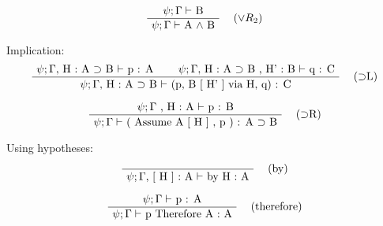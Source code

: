\documentclass[twoside,a4paper]{article}
\begin{document}
\[
\AxiomC{$\psi ; \Gamma \vdash$ B}
\RightLabel{\quad ($\vee R_2$)}
\UnaryInfC{$\psi ; \Gamma \vdash$ A $\wedge$ B}
\DisplayProof
\]

Implication:
\[
\AxiomC{$\psi ; \Gamma ,$ H : A $\supset$ B $\vdash$ p : A}
\AxiomC{$\psi ; \Gamma ,$ H : A $\supset$ B , H' : B $\vdash$ q : C}
\RightLabel{\quad ($\supset$L)}
\BinaryInfC{$\psi ; \Gamma ,$ H : A $\supset$ B $\vdash$
(p, B [ H' ] via H, q) : C}
\DisplayProof
\]

\[
\AxiomC{$\psi ; \Gamma$ , H : A $\vdash$ p : B}
\RightLabel{\quad ($\supset$R)}
\UnaryInfC{$\psi ; \Gamma \vdash$ ( Assume A [ H ] , p ) : A 
$\supset$ B}
\DisplayProof
\]

Using hypotheses:

\[
\AxiomC{}
\RightLabel{\quad (by)}
\UnaryInfC{$\psi ; \Gamma , $ [ H ] : A $\vdash$ by H : A}
\DisplayProof
\]

\[
\AxiomC{$\psi ; \Gamma \vdash$ p : A}
\RightLabel{\quad (therefore)}
\UnaryInfC{$\psi ; \Gamma \vdash$ p Therefore A : A}
\DisplayProof
\]
\end{document}
